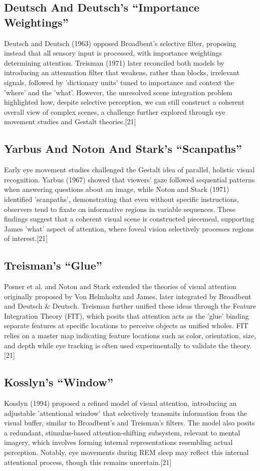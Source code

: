 \documentclass[12pt]{report}
\begin{document}
\subsection{Deutsch And Deutsch's “Importance Weightings”}
Deutsch and Deutsch (1963) opposed Broadbent's selective filter, proposing instead that all sensory input is processed, with importance weightings determining attention.
Treisman (1971) later reconciled both models by introducing an attenuation filter that weakens, rather than blocks, irrelevant signals, followed by 'dictionary units' tuned to importance and context the 'where' and the 'what'. 
However, the unresolved scene integration problem highlighted how, despite selective perception, we can still construct a coherent overall view of complex scenes, a challenge further explored through eye movement studies and Gestalt theories.[21]

\subsection{Yarbus And Noton And Stark's “Scanpaths”}
Early eye movement studies challenged the Gestalt idea of parallel, holistic visual recognition. 
Yarbus (1967) showed that viewers' gaze followed sequential patterns when answering questions about an image, while Noton and Stark (1971) identified 'scanpaths', demonstrating that even without specific instructions, observers tend to fixate on informative regions in variable sequences. 
These findings suggest that a coherent visual scene is constructed piecemeal, supporting James 'what' aspect of attention, where foveal vision selectively processes regions of interest.[21]

\subsection{Treisman's “Glue”}
Posner et al. and Noton and Stark extended the theories of visual attention originally proposed by Von Helmholtz and James, later integrated by Broadbent and Deutsch \& Deutsch. 
Treisman further unified these ideas through the Feature Integration Theory (FIT), which posits that attention acts as the 'glue' binding separate features at specific locations to perceive objects as unified wholes. 
FIT relies on a master map indicating feature locations such as color, orientation, size, and depth while eye tracking is often used experimentally to validate the theory.[21]

\subsection{Kosslyn's “Window”}
Kosslyn (1994) proposed a refined model of visual attention, introducing an adjustable 'attentional window' that selectively transmits information from the visual buffer, similar to Broadbent's and Treisman's filters. 
The model also posits a redundant, stimulus-based attention-shifting subsystem, relevant to mental imagery, which involves forming internal representations resembling actual perception. 
Notably, eye movements during REM sleep may reflect this internal attentional process, though this remains uncertain.[21]
\end{document}
